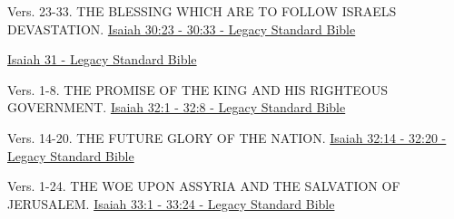 \documentclass[
  ignorenonframetext,
]{beamer}
\begin{document}
\begin{frame}{30}
\label{section-60}
\begin{block}{Vers. 23-33. THE BLESSING WHICH ARE TO FOLLOW
ISRAEL\textquotesingle S DEVASTATION.}
\label{vers.-23-33.-the-blessing-which-are-to-follow-israels-devastation.}
\href{https://read.lsbible.org/?q=isa30\%3A23-33}{Isaiah 30:23 - 30:33 -
Legacy Standard Bible}
\end{block}
\end{frame}

\begin{frame}{31}
\label{section-61}
\href{https://read.lsbible.org/?q=isa31}{Isaiah 31 - Legacy Standard
Bible}
\end{frame}

\begin{frame}{32}
\label{section-62}
\begin{block}{Vers. 1-8. THE PROMISE OF THE KING AND HIS RIGHTEOUS
GOVERNMENT.}
\label{vers.-1-8.-the-promise-of-the-king-and-his-righteous-government.}
\href{https://read.lsbible.org/?q=isa32\%3A1-8}{Isaiah 32:1 - 32:8 -
Legacy Standard Bible}
\end{block}

\begin{block}{Vers. 14-20. THE FUTURE GLORY OF THE NATION.}
\label{vers.-14-20.-the-future-glory-of-the-nation.}
\href{https://read.lsbible.org/?q=isa32\%3A14-20}{Isaiah 32:14 - 32:20 -
Legacy Standard Bible}
\end{block}
\end{frame}

\begin{frame}{33}
\label{section-63}
\begin{block}{Vers. 1-24. THE WOE UPON ASSYRIA AND THE SALVATION OF
JERUSALEM.}
\label{vers.-1-24.-the-woe-upon-assyria-and-the-salvation-of-jerusalem.}
\href{https://read.lsbible.org/?q=isa33\%3A1-24}{Isaiah 33:1 - 33:24 -
Legacy Standard Bible}
\end{block}
\end{frame}
\end{document}
